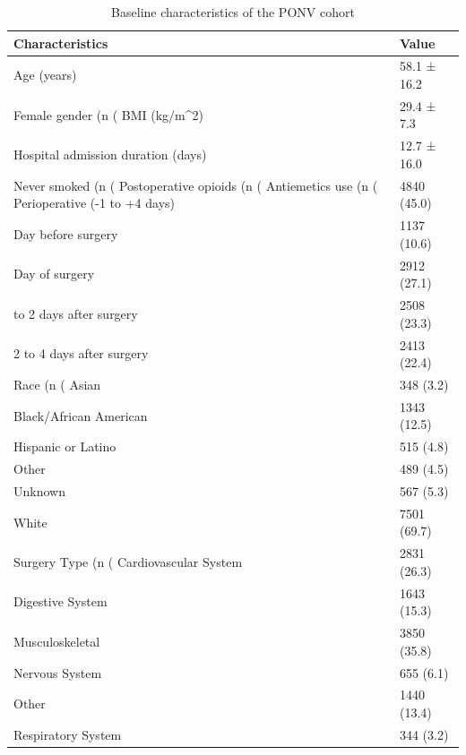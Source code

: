 \begin{table}

\caption{Baseline characteristics of the PONV cohort}
\centering
\begin{tabular}[t]{ll}
\toprule
Characteristics & Value\\
\midrule
Age (years) & 58.1 ± 16.2\\
Female gender (n (%
BMI (kg/m^2) & 29.4 ± 7.3\\
Hospital admission duration (days) & 12.7 ± 16.0\\
Never smoked (n (%
\addlinespace
Postoperative opioids (n (%
Antiemetics use (n (%
Perioperative (-1 to +4 days) & 4840 (45.0)\\
Day before surgery & 1137 (10.6)\\
Day of surgery & 2912 (27.1)\\
\addlinespace
1 to 2 days after surgery & 2508 (23.3)\\
2 to 4 days after surgery & 2413 (22.4)\\
Race (n (%
Asian & 348 (3.2)\\
Black/African American & 1343 (12.5)\\
\addlinespace
Hispanic or Latino & 515 (4.8)\\
Other & 489 (4.5)\\
Unknown & 567 (5.3)\\
White & 7501 (69.7)\\
Surgery Type (n (%
\addlinespace
Cardiovascular System & 2831 (26.3)\\
Digestive System & 1643 (15.3)\\
Musculoskeletal & 3850 (35.8)\\
Nervous System & 655 (6.1)\\
Other & 1440 (13.4)\\
\addlinespace
Respiratory System & 344 (3.2)\\
\bottomrule
\end{tabular}
\end{table}
